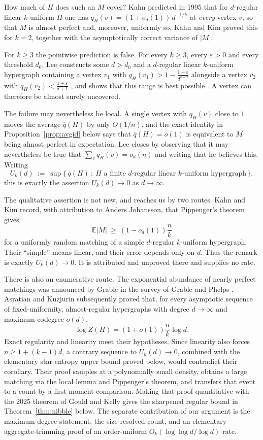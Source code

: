 \documentclass[11pt,a4paper]{amsart}
\theoremstyle{plain}
\theoremstyle{definition}
\theoremstyle{remark}
\newcommand{\EX}{\mathbb{E}}
\newcommand{\qbar}{\overline{q}}
\begin{document}
How much of $H$ does such an $M$ cover? Kahn \cite{Kahn95,Kahn97} predicted in 1995 that
for $d$-regular linear $k$-uniform $H$ one has $q_H(v)=(1+o_d(1))\,d^{-1/k}$ at
\emph{every} vertex $v$, so that $M$ is almost perfect and, moreover, uniformly so. Kahn
and Kim \cite{KahnKim98} proved this for $k=2$, together with the asymptotically correct
variance of $|M|$.

For $k\ge3$ the pointwise prediction is false. For every $k\ge3$, every
$\varepsilon>0$ and every threshold $d_0$, Lee \cite{Lee} constructs some $d>d_0$ and a
$d$-regular linear $k$-uniform hypergraph containing a vertex $v_1$ with
$q_H(v_1)>1-\frac{1+\varepsilon}{d^{k-2}}$ alongside a vertex $v_2$ with
$q_H(v_2)<\frac{1+\varepsilon}{d+1}$ \cite[Theorem 1.4]{Lee}, and shows that this range is
best possible \cite[Theorem 1.5]{Lee}. A vertex can therefore be almost surely uncovered.

The failure may nevertheless be local. A single vertex with $q_H(v)$ close to $1$ moves
the average $\qbar(H)$ by only $O(1/n)$, and the exact identity in
Proposition~\ref{prop:avgid} below says that $\qbar(H)=o(1)$ is equivalent to $M$ being
almost perfect in expectation. Lee closes \cite{Lee} by observing that it may nevertheless
be true that $\sum_v q_H(v)=o_d(n)$ and writing that he believes this.
Writing
\[
  U_k(d)\ :=\ \sup\bigl\{\,\qbar(H)\ :\ H\text{ a finite $d$-regular linear $k$-uniform
  hypergraph}\,\bigr\},
\]
this is exactly the assertion $U_k(d)\to0$ as $d\to\infty$.

The qualitative assertion is not new, and reaches us by two routes. Kahn and Kim
\cite[p.~204]{KahnKim98} record, with attribution to Anders Johansson, that Pippenger's
theorem gives
\[
  \EX|M|\ \ge\ (1-o_d(1))\frac{n}{k}
\]
for a uniformly random matching of a simple $d$-regular $k$-uniform hypergraph. Their
``simple'' means linear, and their error depends only on $d$. Thus the remark is exactly
$U_k(d)\to0$. It is attributed and unproved there and supplies no rate.

There is also an enumerative route. The exponential abundance of nearly perfect
matchings was announced by Grable in the survey of Grable and Phelps
\cite{GrablePhelps}. Asratian and Kuzjurin \cite[Theorem 2 and Corollaries 1--2,
\S3]{AsratianKuzjurin} subsequently proved that, for every asymptotic sequence of
fixed-uniformity, almost-regular hypergraphs with degree $d\to\infty$ and maximum
codegree $o(d)$,
\[
  \log Z(H)=(1+o(1))\frac{n}{k}\log d.
\]
Exact regularity and linearity meet their hypotheses. Since linearity also forces
$n\ge1+(k-1)d$, a contrary sequence to $U_k(d)\to0$, combined with the elementary
star-entropy upper bound proved below, would contradict their corollary. Their proof
samples at a polynomially small density, obtains a large matching via the local lemma and
Pippenger's theorem, and transfers that event to a count by a first-moment comparison.
Making that proof quantitative with the 2025 theorem of Gould and Kelly gives the
sharpened regular bound in Theorem~\ref{thm:nibble} below. The separate contribution of
our argument is the maximum-degree statement, the size-resolved count, and an elementary
aggregate-trimming proof of an order-uniform $O_k(\log\log d/\log d)$ rate.
\end{document}
